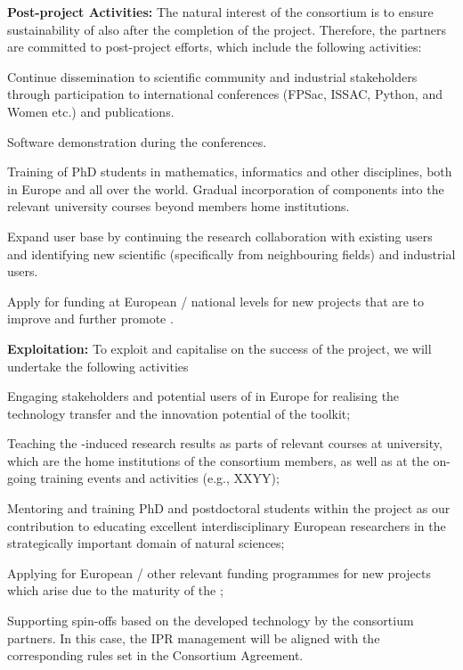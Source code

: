 {\bf Post-project Activities:} The natural interest of the consortium is to ensure sustainability of \TheProject also after the completion of the project. Therefore, the partners are committed to post-project efforts, which include the following activities: 
\begin{compactenum}
\item Continue dissemination to scientific community and industrial stakeholders through participation to international conferences (FPSac, ISSAC, Python, \Sage and Women etc.) and publications.
\item Software demonstration during the conferences.
\item Training of  PhD students in mathematics, informatics and other disciplines, both in Europe and all over the world. Gradual incorporation of \TheProject components into the relevant university courses beyond \TheProject members home institutions.
\item Expand \TheProject user base by continuing the research collaboration with existing users and  identifying new scientific (specifically from neighbouring fields) and industrial users.
\item Apply for funding at European / national levels for new projects that are to improve and further promote \TheProject.
\end{compactenum}


{\bf Exploitation:} To exploit and capitalise on the success of the project, we will undertake the following activities
\begin{compactenum}
\item Engaging stakeholders and potential users of \TheProject in Europe for realising the technology transfer and the innovation potential of the toolkit;
\item Teaching the \TheProject-induced research results as parts of relevant courses at university, which are the home institutions of the consortium members, as well as at the on-going training events and activities (e.g., XXYY);
\item Mentoring and training PhD and postdoctoral students within the project as our contribution to educating excellent interdisciplinary European researchers in the strategically important domain of natural sciences;
\item Applying for European / other relevant funding programmes for new projects which arise due to the maturity of the \TheProject;
\item Supporting spin-offs based on the developed technology by the consortium partners. In this case, the IPR management will be aligned with the corresponding rules set in the Consortium Agreement.
\end{compactenum}

